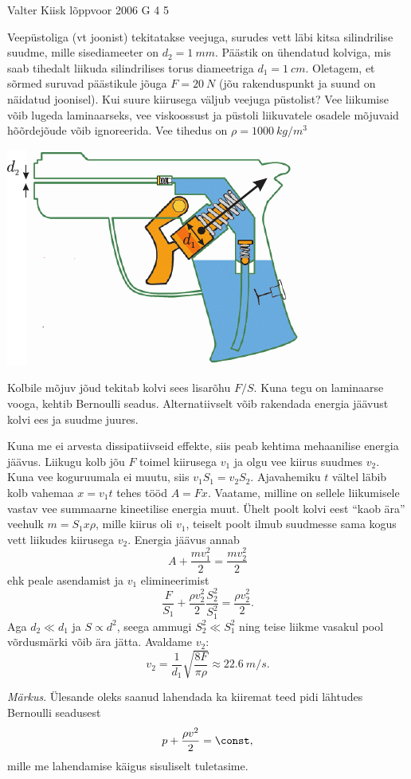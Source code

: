 {Valter Kiisk} %
{lõppvoor} %
{2006} %
{G 4} %
{5} %
{
\ifStatement
Veepüstoliga (vt joonist) tekitatakse veejuga, surudes vett läbi kitsa silindrilise suudme, mille sisediameeter on $d_2 = \SI{1}{mm}$. Päästik on ühendatud kolviga, mis saab tihedalt liikuda silindrilises torus diameetriga $d_1 = \SI{1}{cm}$. Oletagem, et sõrmed suruvad päästikule jõuga $F = \SI{20}{N}$ (jõu rakenduspunkt ja suund on näidatud joonisel). Kui suure kiirusega väljub veejuga püstolist? Vee liikumise võib lugeda laminaarseks, vee viskoossust ja püstoli liikuvatele osadele mõjuvaid hõõrdejõude võib ignoreerida. Vee tihedus on $\rho = \SI{1000}{kg/m^3}$

\begin{center}
	\includegraphics[width=0.6\linewidth]{2006-v3g-04-yl}
\end{center}
\fi


\ifHint
Kolbile mõjuv jõud tekitab kolvi sees lisarõhu $F/S$. Kuna tegu on laminaarse vooga, kehtib Bernoulli seadus. Alternatiivselt võib rakendada energia jäävust kolvi ees ja suudme juures.
\fi


\ifSolution
Kuna me ei arvesta dissipatiivseid effekte, siis peab kehtima mehaanilise energia jäävus. Liikugu kolb jõu $F$ toimel kiirusega $v_1$ ja olgu vee kiirus suudmes $v_2$. Kuna vee koguruumala ei muutu, siis $v_1S_1 = v_2S_2$. Ajavahemiku $t$ vältel
läbib kolb vahemaa $x = v_1t$ tehes tööd $A = F x$. Vaatame, milline on sellele liikumisele vastav vee summaarne kineetilise energia muut. Ühelt poolt kolvi eest \enquote{kaob ära} veehulk $m = S_1x\rho$, mille kiirus oli $v_1$, teiselt poolt ilmub suudmesse sama kogus vett liikudes kiirusega $v_2$. Energia jäävus annab
\[
A+\frac{m v_{1}^{2}}{2}=\frac{m v_{2}^{2}}{2}
\]
ehk peale asendamist ja $v_1$ elimineerimist
\[
\frac{F}{S_{1}}+\frac{\rho v_{2}^{2}}{2} \frac{S_{2}^{2}}{S_{1}^{2}}=\frac{\rho v_{2}^{2}}{2}.
\]
Aga $d_2 \ll d_1$ ja $S \propto d^2$, seega ammugi $S_2^2 \ll S_1^2$ ning teise liikme vasakul pool võrdusmärki võib ära jätta. Avaldame $v_2$:
\[
v_{2}=\frac{1}{d_{1}} \sqrt{\frac{8 F}{\pi \rho}} \approx \SI{22,6}{m/s}.
\]

\emph{Märkus}. Ülesande oleks saanud lahendada ka kiiremat teed pidi lähtudes Bernoulli seadusest
\[
p+\frac{\rho v^{2}}{2}=\const,
\]
mille me lahendamise käigus sisuliselt tuletasime.
\fi
}